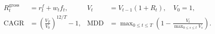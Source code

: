 \documentclass[11pt,border=2pt]{standalone}
\begin{document}
{\color{mathblue}$\displaystyle \begin{aligned}R_t^{\mathrm{gross}}&=r_t^f+w_tf_t,&V_t&=V_{t-1}(1+R_t),\quad V_0=1,\\ \mathrm{CAGR}&=\left(\frac{V_T}{V_0}\right)^{12/T}-1,&\mathrm{MDD}&=\max_{0\leq t\leq T}\left(1-\frac{V_t}{\max_{0\leq s\leq t}V_s}\right).\end{aligned}$}
\end{document}
